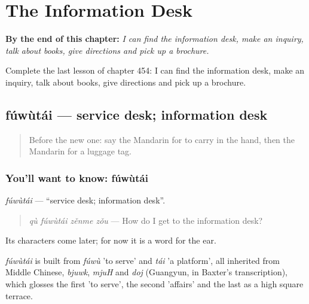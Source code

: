 
\chapter{The Information Desk}
\label{ch:zh-the-information-desk}

\begin{chapteropening}
\textbf{By the end of this chapter:} \emph{I can find the information desk, make an inquiry, talk about books, give directions and pick up a brochure.}

Complete the last lesson of chapter 454: I can find the information desk, make an inquiry, talk about books, give directions and pick up a brochure.
\end{chapteropening}

\section[fúwùtái]{fúwùtái — service desk; information desk}

\label{lesson:ZH-C454-fuwutai}



\begin{quote}
Before the new one: say the Mandarin for to carry in the hand, then the Mandarin for a luggage tag.
\end{quote}

\subsection*{You'll want to know: fúwùtái}
\emph{fúwùtái} — \textquotedblleft{}service desk; information desk\textquotedblright{}.

\begin{quote}
\emph{qù fúwùtái zěnme zǒu} — How do I get to the information desk?
\end{quote}

Its characters come later; for now it is a word for the ear.

\begin{cousinweb}
\emph{fúwùtái} is built from \emph{fúwù} 'to serve' and \emph{tái} 'a platform', all inherited from Middle Chinese, \emph{bjuwk}, \emph{mjuH} and \emph{doj} (Guangyun, in Baxter's transcription), which glosses the first 'to serve', the second 'affairs' and the last as a high square terrace.
\end{cousinweb}

